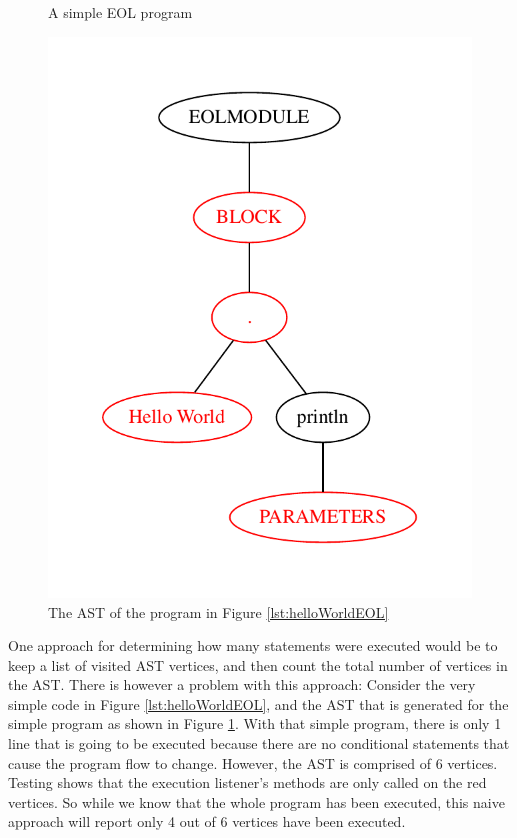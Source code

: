 \begin{figure}
\centering
\begin{minipage}[b]{.47\textwidth}
  \centering
  
  \caption{A simple EOL program}
  \label{lst:helloWorldEOL}
\end{minipage}%
\begin{minipage}{0.04\textwidth}
\hspace{1.00mm}
\end{minipage}
\begin{minipage}[b]{.47\textwidth}
  \centering
  \includegraphics[scale=0.5]{figures/HelloWorldAST.pdf}
  \caption{The AST of the program in Figure \ref{lst:helloWorldEOL}}
  \label{fig:helloWorldAST}
\end{minipage}
\end{figure}

One approach for determining how many statements were executed would be to keep a list of visited AST vertices, and then count the total number of vertices in the AST. There is however a problem with this approach: Consider the very simple code in Figure \ref{lst:helloWorldEOL}, and the AST that is generated for the simple program as shown in Figure \ref{fig:helloWorldAST}. With that simple program, there is only 1 line that is going to be executed because there are no conditional statements that cause the program flow to change. However, the AST is comprised of 6 vertices. Testing shows that the execution listener's methods are only called on the red vertices. So while we know that the whole program has been executed, this naive approach will report only 4 out of 6 vertices have been executed.

